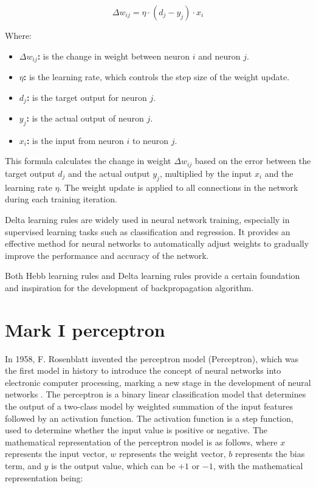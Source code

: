 \documentclass[12pt,a4paper]{report}
\begin{document}
\[ \Delta w_{ij} = \eta \cdot (d_j - y_j) \cdot x_i \]

Where:

\begin{itemize}
    \item \textbf{ $\Delta w_{ij}$:} is the change in weight between neuron \( i \) and neuron \( j \).
    \item \textbf{$\eta $:} is the learning rate, which controls the step size of the weight update.
    \item \textbf{ $d_{j}$:} is the target output for neuron \( j \).
    \item \textbf{$y_j$:} is the actual output of neuron \( j \).
    \item \textbf{$x_i$:} is the input from neuron \( i \) to neuron \( j \).
\end{itemize}

This formula calculates the change in weight \( \Delta w_{ij} \) based on the error between the target output \( d_j \) and the actual output \( y_j \), multiplied by the input \( x_i \) and the learning rate \( \eta \). The weight update is applied to all connections in the network during each training iteration.


Delta learning rules are widely used in neural network training, especially in supervised learning tasks such as classification and regression. It provides an effective method for neural networks to automatically adjust weights to gradually improve the performance and accuracy of the network.

Both Hebb learning rules and Delta learning rules provide a certain foundation and inspiration for the development of backpropagation algorithm.



\section{Mark I perceptron}

In 1958, F. Rosenblatt invented the perceptron model (Perceptron), which was the first model in history to introduce the concept of neural networks into electronic computer processing, marking a new stage in the development of neural networks \cite{Rosenblatt1958PerceptronProbabilisticModel}. The perceptron is a binary linear classification model that determines the output of a two-class model by weighted summation of the input features followed by an activation function. The activation function is a step function, used to determine whether the input value is positive or negative. The mathematical representation of the perceptron model is as follows, where \( x \) represents the input vector, \( w \) represents the weight vector, \( b \) represents the bias term, and \( y \) is the output value, which can be \(+1\) or \(-1\), with the mathematical representation being:
\end{document}
